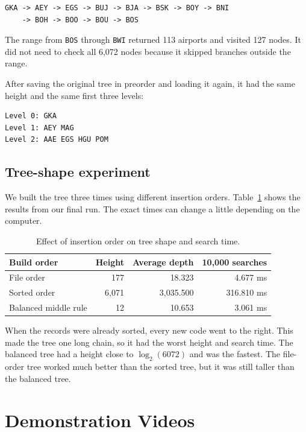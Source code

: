 \documentclass[12pt]{article}
\begin{document}
\begin{Verbatim}[fontsize=\small,frame=single,breaklines=true]
GKA -> AEY -> EGS -> BUJ -> BJA -> BSK -> BOY -> BNI
    -> BOH -> BOO -> BOU -> BOS
\end{Verbatim}

The range from \texttt{BOS} through \texttt{BWI} returned 113 airports and visited 127 nodes. It did not need to check all 6,072 nodes because it skipped branches outside the range.

After saving the original tree in preorder and loading it again, it had the same height and the same first three levels:

\begin{Verbatim}[fontsize=\small,frame=single]
Level 0: GKA
Level 1: AEY MAG
Level 2: AAE EGS HGU POM
\end{Verbatim}

\subsection{Tree-shape experiment}

We built the tree three times using different insertion orders. Table~\ref{tab:experiment} shows the results from our final run. The exact times can change a little depending on the computer.

\begin{table}[H]
\centering
\caption{Effect of insertion order on tree shape and search time.}
\label{tab:experiment}
\begin{tabular}{@{}lrrr@{}}
\toprule
\textbf{Build order} & \textbf{Height} & \textbf{Average depth} & \textbf{10,000 searches} \\
\midrule
File order & 177 & 18.323 & 4.677 ms \\
Sorted order & 6,071 & 3,035.500 & 316.810 ms \\
Balanced middle rule & 12 & 10.653 & 3.061 ms \\
\bottomrule
\end{tabular}
\end{table}

When the records were already sorted, every new code went to the right. This made the tree one long chain, so it had the worst height and search time. The balanced tree had a height close to $\log_2(6072)$ and was the fastest. The file-order tree worked much better than the sorted tree, but it was still taller than the balanced tree.

\section{Demonstration Videos}
\end{document}
